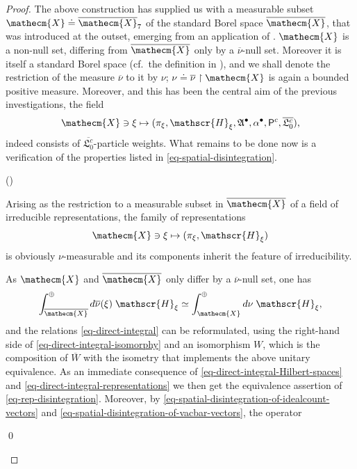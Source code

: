 \documentclass[11pt,twoside,openright]{report}
\theoremstyle{definition}
\theoremstyle{plain}
\theoremstyle{remark}
\theoremstyle{assumption}
\newcommand{\Xecm}{\mathecm{X}}
\newcommand{\Hscr}{\mathscr{H}}
\newcommand{\Xecmbar}{\overline{\mathecm{X}}}
\newcommand{\Wbar}{\overline{W}}
\newcommand{\nubar}{\overline{\nu}}
\newcommand{\Pcount}{\mathsf{P}^c}
\newcommand{\vaccountbar}{\overline{\mathfrak{L}_0^c}}
\newcommand{\Abullet}{\mathfrak{A}^\bullet}
\newcounter{proofitem}
\newenvironment{prooflist}{\begin{list}{(\roman{proofitem})}%
  {\usecounter{proofitem} \setlength{\topsep}{0ex}%
   \setlength{\parsep}{0.2ex} \setlength{\itemsep}{0.4ex}%
   \setlength{\leftmargin}{0em} \setlength{\itemindent}{0.5em}%
   \setlength{\listparindent}{1em}}}{\qed \end{list}}
\begin{document}
\begin{proof}
  The above construction has supplied us with a measurable subset
  $\Xecm \doteq \Xecmbar_7$ of the standard Borel space $\Xecmbar$,
  that was introduced at the outset, emerging from an application of
  \cite[Theorem~8.5.2]{dixmier:1982}. $\Xecm$ is a non-null set,
  differing from $\Xecmbar$ only by a $\nubar$-null set. Moreover it
  is itself a standard Borel space (cf.~the definition in
  \cite[Section~3.3]{arveson:1976}), and we shall denote the
  restriction of the measure $\nubar$ to it by $\nu$; $\nu \doteq
  \nubar \restriction \Xecm$ is again a bounded positive
  measure. Moreover, and this has been the central aim of the previous
  investigations, the field
  \begin{equation*}
    \Xecm \ni \xi \mapsto ( \pi_\xi , \Hscr_\xi , \Abullet ,
    \alpha^\bullet , \Pcount , \vaccountbar) \text{,}
  \end{equation*}
  indeed consists of $\vaccountbar$-particle weights. What remains to
  be done now is a verification of the properties listed in
  \eqref{eq-spatial-disintegration}.
  \begin{prooflist}
  \item Arising as the restriction to a measurable subset in
    $\Xecmbar$ of a field of irreducible representations, the family
    of representations
    \begin{equation*}
      \Xecm \ni \xi \mapsto ( \pi_\xi , \Hscr_\xi )
    \end{equation*}
    is obviously $\nu$-measurable and its components inherit the
    feature of irreducibility.
  \item As $\Xecm$ and $\Xecmbar$ only differ by a $\nubar$-null set,
    one has
    \begin{equation}
      \label{eq-direct-integral-isomorphy}
      \int_{\Xecmbar}^\oplus d \nubar ( \xi ) \; \Hscr_\xi \simeq
      \int_\Xecm^\oplus d \nu \; \Hscr_\xi \text{,}
    \end{equation}
    and the relations \eqref{eq-direct-integral} can be reformulated,
    using the right-hand side of \eqref{eq-direct-integral-isomorphy}
    and an isomorphism $W$, which is the composition of $\Wbar$ with
    the isometry that implements the above unitary equivalence. As an
    immediate consequence of \eqref{eq-direct-integral-Hilbert-spaces}
    and \eqref{eq-direct-integral-representations} we then get the
    equivalence assertion of \eqref{eq-rep-disintegration}. Moreover,
    by \eqref{eq-spatial-disintegration-of-idealcount-vectors} and
    \eqref{eq-spatial-disintegration-of-vacbar-vectors}, the operator

\end{prooflist}
\end{proof}
\end{document}
